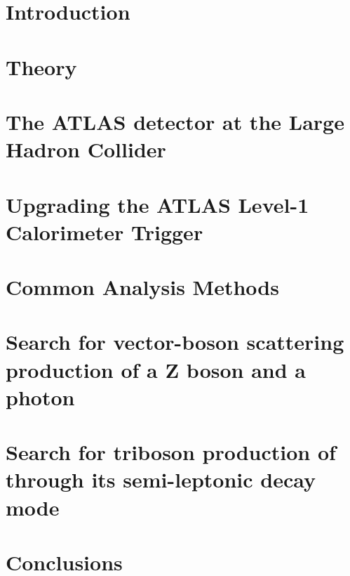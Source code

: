 \newcommand\relpath[1]{#1}
\newcommand\inputchapter[1]{}
\newcommand\resource[1]{#1}
\chapter{Introduction}
\inputchapter{introduction}

\chapter{Theory}
\inputchapter{theory}

\chapter{The ATLAS detector at the Large Hadron Collider}
\inputchapter{detector}

\chapter{Upgrading the ATLAS Level-1 Calorimeter Trigger}
\inputchapter{l1calo}

\chapter{Common Analysis Methods}
\inputchapter{analysis-common}

\chapter{Search for vector-boson scattering production of a Z boson and a photon}
\inputchapter{vbs}

\chapter{Search for triboson production of \VZy through its semi-leptonic decay mode}
\inputchapter{vzy}

\chapter{Conclusions}
\inputchapter{conclusion}
